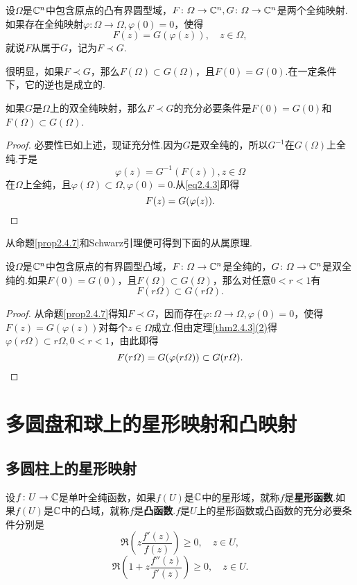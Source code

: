设$\Omega$是$\MC^n$中包含原点的凸有界圆型域，$F\colon\Omega\to\MC^n,G\colon\Omega\to\MC^n$是两个全纯映射.如果存在全纯映射$\varphi\colon \Omega\to\Omega,\varphi(0)=0$，使得
\[F(z)=G(\varphi(z)),\quad z\in\Omega,\]
就说$F$从属于$G$，记为$F\prec G$.

很明显，如果$F\prec G$，那么$F(\Omega)\subset G(\Omega)$，且$F(0)=G(0)$.在一定条件下，它的逆也是成立的.
\begin{prop}\label{prop2.4.7}
	如果$G$是$\Omega$上的双全纯映射，那么$F\prec G$的充分必要条件是$F(0)=G(0)$和$F(\Omega)\subset G(\Omega)$.
\end{prop}
\begin{proof}
	必要性已如上述，现证充分性.因为$G$是双全纯的，所以$G^{-1}$在$G(\Omega)$上全纯.于是
	\begin{equation}\label{eq2.4.3}
		\varphi(z)=G^{-1}(F(z)),z\in\Omega
	\end{equation}
在$\Omega$上全纯，且$\varphi(\Omega)\subset\Omega,\varphi(0)=0$.从\eqref{eq2.4.3}即得
\[F(z)=G(\varphi(z)).\qedhere\]
	\end{proof}
从命题\ref{prop2.4.7}和Schwarz引理便可得到下面的从属原理.
\begin{theorem}\label{thm2.4.8}
	设$\Omega$是$\MC^n$中包含原点的有界圆型凸域，$F\colon\Omega\to\MC^n$是全纯的，$G\colon\Omega\to\MC^n$是双全纯的.如果$F(0)=G(0)$，且$F(\Omega)\subset G(\Omega)$，那么对任意$0<r<1$有
	\[F(r\Omega)\subset G(r\Omega).\]
\end{theorem}
\begin{proof}
	从命题\ref{prop2.4.7}得知$F\prec G$，因而存在$\varphi\colon\Omega\to\Omega,\varphi(0)=0$，使得$F(z)=G(\varphi(z))$对每个$z\in\Omega$成立.但由定理\ref{thm2.4.3}\hyperlink{2.4.3}{(2)}得$\varphi(r\Omega)\subset r\Omega,0<r<1$，由此即得
	\[F(r\Omega)=G(\varphi(r\Omega))\subset G(r\Omega).\qedhere\]
\end{proof}
\section{多圆盘和球上的星形映射和凸映射\label{sec2.5}}
\subsection{多圆柱上的星形映射}
设$f\colon U\to\MC$是单叶全纯函数，如果$f(U)$是$\MC$中的星形域，就称$f$是\textbf{星形函数}.如果$f(U)$是$\MC$中的凸域，就称$f$是\textbf{凸函数}.$f$是$U$上的星形函数或凸函数的充分必要条件分别是
\[\Re\left(z\frac{f'(z)}{f(z)}\right)\ge0,\quad z\in U,\]
\[\Re\left(1+z\frac{f''(z)}{f'(z)}\right)\ge0,\quad z\in U.\]

